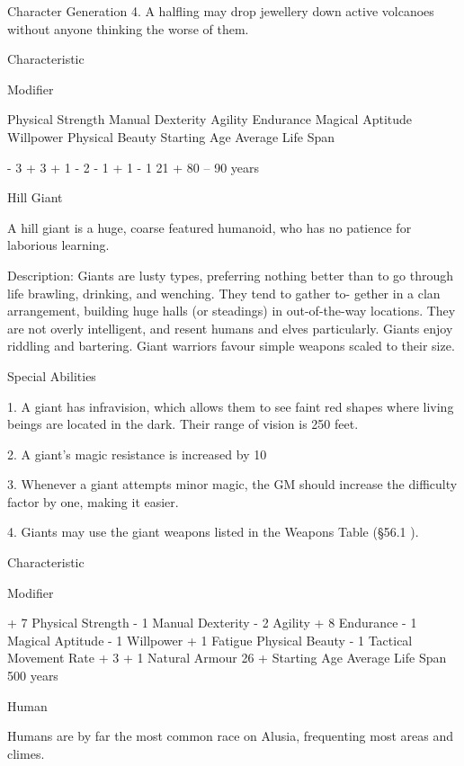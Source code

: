 \begin{Chapter}{Character Generation}
4.  A  halfling  may  drop  jewellery  down  active 
volcanoes  without  anyone  thinking  the  worse  of 
them. 

Characteristic 

Modifier 

Physical Strength 
Manual Dexterity 
Agility 
Endurance 
Magical Aptitude 
Willpower 
Physical Beauty 
Starting Age 
Average Life Span 

- 3 
+ 3 
+ 1 
- 2 
- 1 
+ 1 
- 1 
21 + 
80 – 90 years 

Hill Giant 

A hill giant is a huge, coarse featured humanoid, 
who has no patience for laborious learning. 

Description:  Giants  are  lusty  types,  preferring 
nothing  better  than  to  go  through  life  brawling, 
drinking,  and  wenching.  They  tend  to  gather  to-
gether  in  a  clan  arrangement,  building  huge  halls 
(or steadings) in out-of-the-way locations. They are 
not overly intelligent, and resent humans and elves 
particularly.  Giants  enjoy  riddling  and  bartering. 
Giant  warriors  favour  simple  weapons  scaled  to 
their size. 

Special Abilities 

1.  A  giant  has  infravision,  which  allows  them  to 
see faint red shapes where living beings are located 
in the dark. Their range of vision is 250 feet. 

2. A giant’s magic resistance is increased by 10%

3. Whenever a giant attempts minor magic, the GM 
should increase the difficulty factor by one, making 
it easier. 

4.  Giants  may  use  the  giant  weapons  listed  in  the 
Weapons Table (§56.1 ). 

Characteristic  

Modifier 

+ 7 
Physical Strength  
- 1 
Manual Dexterity  
- 2 
Agility  
+ 8 
Endurance  
- 1 
Magical Aptitude  
- 1 
Willpower  
+ 1 
Fatigue  
Physical Beauty  
- 1 
Tactical Movement Rate   + 3 
+ 1 
Natural Armour  
26 +  
Starting Age  
Average Life Span  
500 years 

Human 

Humans  are  by  far  the  most  common  race  on 
Alusia, frequenting most areas and climes. 


\end{Chapter}
